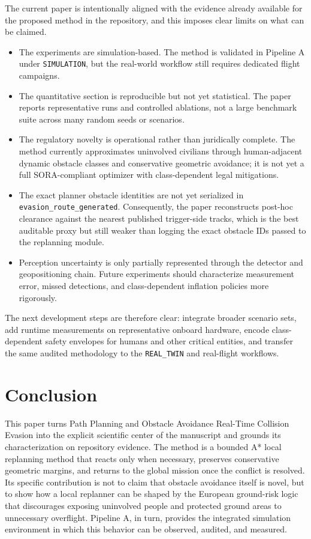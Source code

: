 \documentclass[a4paper,11pt]{article}
\begin{document}
The current paper is intentionally aligned with the evidence already available for the proposed method in the repository, and this imposes clear limits on what can be claimed.
\begin{itemize}[leftmargin=1.3em]
    \item The experiments are simulation-based. The method is validated in Pipeline A under \texttt{SIMULATION}, but the real-world workflow still requires dedicated flight campaigns.
    \item The quantitative section is reproducible but not yet statistical. The paper reports representative runs and controlled ablations, not a large benchmark suite across many random seeds or scenarios.
    \item The regulatory novelty is operational rather than juridically complete. The method currently approximates uninvolved civilians through human-adjacent dynamic obstacle classes and conservative geometric avoidance; it is not yet a full SORA-compliant optimizer with class-dependent legal mitigations.
    \item The exact planner obstacle identities are not yet serialized in \texttt{evasion\_route\_generated}. Consequently, the paper reconstructs post-hoc clearance against the nearest published trigger-side tracks, which is the best auditable proxy but still weaker than logging the exact obstacle IDs passed to the replanning module.
    \item Perception uncertainty is only partially represented through the detector and geopositioning chain. Future experiments should characterize measurement error, missed detections, and class-dependent inflation policies more rigorously.
\end{itemize}

The next development steps are therefore clear: integrate broader scenario sets, add runtime measurements on representative onboard hardware, encode class-dependent safety envelopes for humans and other critical entities, and transfer the same audited methodology to the \texttt{REAL\_TWIN} and real-flight workflows.

\section{Conclusion}

This paper turns Path Planning and Obstacle Avoidance Real-Time Collision Evasion into the explicit scientific center of the manuscript and grounds its characterization on repository evidence. The method is a bounded A* local replanning method that reacts only when necessary, preserves conservative geometric margins, and returns to the global mission once the conflict is resolved. Its specific contribution is not to claim that obstacle avoidance itself is novel, but to show how a local replanner can be shaped by the European ground-risk logic that discourages exposing uninvolved people and protected ground areas to unnecessary overflight. Pipeline A, in turn, provides the integrated simulation environment in which this behavior can be observed, audited, and measured.
\end{document}
